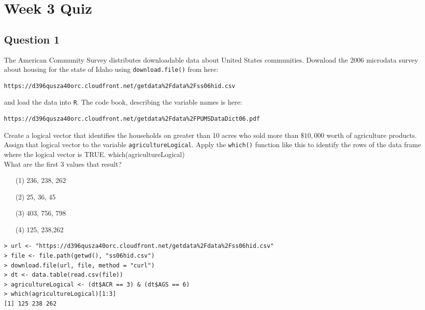\documentclass[]{article}
\begin{document}
\section{Week 3 Quiz}
\subsection*{Question 1}
The American Community Survey distributes downloadable data about United States communities. Download the 2006 microdata survey about housing for the state of Idaho using \texttt{download.file()} from here: 
\begin{verbatim}
https://d396qusza40orc.cloudfront.net/getdata%2Fdata%2Fss06hid.csv 
\end{verbatim}
and load the data into \texttt{R}. The code book, describing the variable names is here: 
\begin{verbatim}
https://d396qusza40orc.cloudfront.net/getdata%2Fdata%2FPUMSDataDict06.pdf 
\end{verbatim}

\noindent Create a logical vector that identifies the households on greater than 10 acres who sold more than $\$10,000$ worth of agriculture products. 
\\
Assign that logical vector to the variable \texttt{agricultureLogical}. Apply the \texttt{which()} function like this to identify the rows of the data frame where the logical vector is TRUE. which(agricultureLogical) 
\\
What are the first 3 values that result?
\begin{itemize}
\item[(1)] 236, 238, 262
\item[(2)] 25, 36, 45
\item[(3)] 403, 756, 798
\item[(4)] 125, 238,262
\end{itemize}
\begin{framed}
\begin{verbatim}
> url <- "https://d396qusza40orc.cloudfront.net/getdata%2Fdata%2Fss06hid.csv"
> file <- file.path(getwd(), "ss06hid.csv")
> download.file(url, file, method = "curl")
> dt <- data.table(read.csv(file))
> agricultureLogical <- (dt$ACR == 3) & (dt$AGS == 6)
> which(agricultureLogical)[1:3]
[1] 125 238 262
\end{verbatim}
\end{framed}
\newpage
\end{document}
